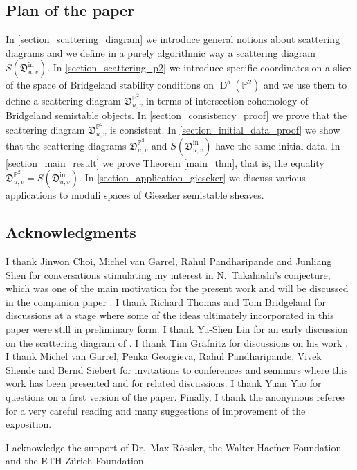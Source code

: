 \documentclass[12pt, a4paper]{amsart}
\newcommand\PP{\mathbb P}
\newcommand\fD{\mathfrak D}
\newcommand\D{\operatorname{D}}
\newcommand\iin{\mathrm{in}}
\begin{document}
\subsection{Plan of the paper}
In 
\cref{section_scattering_diagram} we
introduce general notions about scattering diagrams and we define in a purely algorithmic way a scattering diagram $S(\fD^{\iin}_{u,v})$. 
In \cref{section_scattering_p2}
we introduce specific coordinates on a slice of the space of Bridgeland stability conditions on $\D^b(\PP^2)$ and we use them to define a scattering diagram 
$\fD^{\PP^2}_{u,v}$ in terms of intersection cohomology of Bridgeland semistable objects. 
In \cref{section_consistency_proof} 
we prove that the scattering diagram 
$\fD^{\PP^2}_{u,v}$ is consistent.
In \cref{section_initial_data_proof}
we show that the scattering diagrams 
$\fD^{\PP^2}_{u,v}$ and 
$S(\fD^\iin_{u,v})$ have the same initial data. 
In \cref{section_main_result} 
we prove
Theorem \ref{main_thm},
that is, the equality $\fD^{\PP^2}_{u,v}
=S(\fD^\iin_{u,v})$. In 
\cref{section_application_gieseker} 
we discuss various applications to moduli spaces of Gieseker semistable sheaves.

\subsection{Acknowledgments}
I thank Jinwon Choi, Michel van Garrel, Rahul Pandharipande and Junliang Shen for conversations stimulating my interest in N.\ Takahashi's conjecture, which was one of the main motivation for the present work and will be discussed in the companion paper 
\cite{bousseau2019takahashi}. I thank Richard Thomas and Tom Bridgeland for discussions at a stage where some of the ideas ultimately incorporated in this paper were still in preliminary form. I thank Yu-Shen Lin for an early discussion on the scattering diagram of \cite{cps}. I thank Tim Gr\"afnitz  for discussions on his work \cite{gabele2019tropical}. I thank Michel van Garrel, Penka Georgieva, Rahul Pandharipande, Vivek Shende and Bernd Siebert for invitations to conferences and seminars where this work has been presented and for related discussions.
I thank Yuan Yao for questions on a first version of the paper. Finally, I thank the anonymous referee for a very careful reading and many suggestions of improvement of the exposition.

I acknowledge the support of Dr.\ Max R\"ossler, the Walter Haefner Foundation and the ETH Z\"urich
Foundation.
\end{document}
